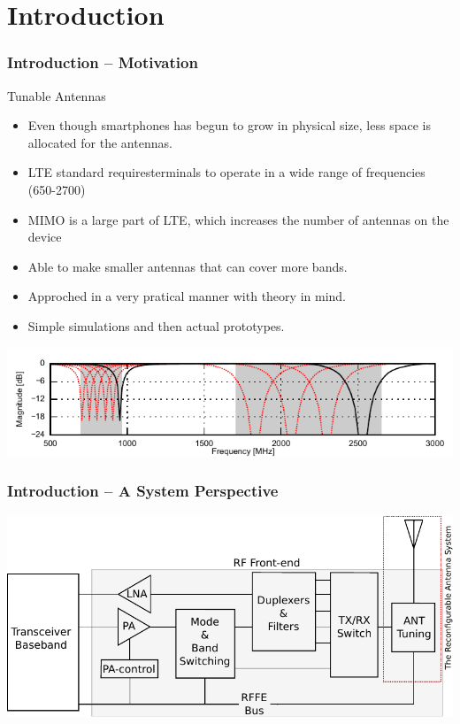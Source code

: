 \section{Introduction}
\begin{frame}
    \frametitle{Introduction -- Motivation}
    \begin{block}{Tunable Antennas}
      \begin{itemize}
      \item Even though smartphones has begun to grow in physical size, less space is allocated for the antennas.
      \item LTE standard requiresterminals to operate in a wide range of frequencies (650-2700)
      \item MIMO is a large part of LTE, which increases the number of antennas on the device 
      \item Able to make smaller antennas that can cover more bands.
      \item Approched in a very pratical manner with theory in mind. 
      \item Simple simulations and then actual prototypes.
      \end{itemize}
    \end{block}
\vspace*{-0.5cm}
  \begin{center} 
   \includegraphics[width=\textwidth]{img/henrik/reconfsweep}
  \end{center}
\end{frame}
\begin{frame}
    \frametitle{Introduction -- A System Perspective}
  \begin{center} \includegraphics[scale=0.8]{img/henrik/system_diagram}
  \end{center}
\end{frame}


